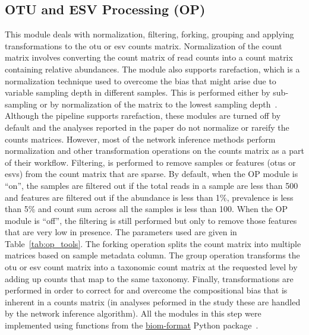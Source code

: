   \subsection*{OTU and ESV Processing (OP)}
  \vspace{-5mm}
  This module deals with normalization, filtering, forking, grouping and applying transformations to the \ac{otu} or \ac{esv} counts matrix.
  Normalization of the count matrix involves converting the count matrix of read counts into a count matrix containing relative abundances.
  The module also supports rarefaction, which is a normalization technique used to overcome the bias that might arise due to variable sampling depth in different samples.
  This is performed either by sub-sampling or by normalization of the matrix to the lowest sampling depth~\cite{Weiss2015}.
  Although the pipeline supports rarefaction, these modules are turned off by default and the analyses reported in the paper do not normalize or rareify the counts matrices.
  However, most of the network inference methods perform normalization and other transformation operations on the counts matrix as a part of their workflow.
  Filtering, is performed to remove samples or features (\ac{otu}s or \ac{esv}s) from the count matrix that are sparse.
  By default, when the OP module is ``on'', the samples are filtered out if the total reads in a sample are less than 500 and features are filtered out if the abundance is less than 1\%, prevalence is less than 5\% and count sum across all the samples is less than 100.
  When the OP module is ``off'', the filtering is still performed but only to remove those features that are very low in presence.
  The parameters used are given in Table~\ref{tab:op_tools}.
  The forking operation splits the count matrix into multiple matrices based on sample metadata column.
  The group operation transforms the \ac{otu} or \ac{esv} count matrix into a taxonomic count matrix at the requested level by adding up counts that map to the same taxonomy.
  Finally, transformations are performed in order to correct for and overcome the compositional bias that is inherent in a counts matrix (in analyses peformed in the study these are handled by the network inference algorithm).
  All the modules in this step were implemented using functions from the \href{http://biom-format.org/}{biom-format} Python package~\cite{mcdonaldBiologicalObservationMatrix2012}.

